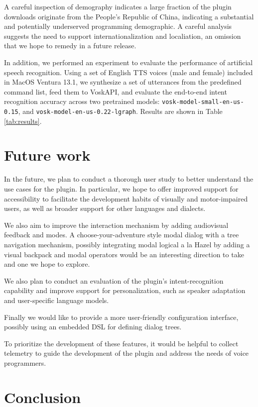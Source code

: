 \documentclass[conference]{IEEEtran}
\begin{document}
A careful inspection of demography indicates a large fraction of the plugin downloads originate from the People's Republic of China, indicating a substantial and potentially underserved programming demographic. A careful analysis suggests the need to support internationalization and localiation, an omission that we hope to remedy in a future release.

In addition, we performed an experiment to evaluate the performance of artificial speech recognition. Using a set of English TTS voices (male and female) included in MacOS Ventura 13.1, we synthesize a set of utterances from the predefined command list, feed them to VoskAPI, and evaluate the end-to-end intent recognition accuracy across two pretrained models: \texttt{vosk-model-small-en-us-0.15}, and \texttt{vosk-model-en-us-0.22-lgraph}. Results are shown in Table \ref{tab:results}.

\section{Future work}

In the future, we plan to conduct a thorough user study to better understand the use cases for the plugin. In particular, we hope to offer improved support for accessibility to facilitate the development habits of visually and motor-impaired users, as well as broader support for other languages and dialects.

We also aim to improve the interaction mechanism by adding audiovisual feedback and modes. A choose-your-adventure style modal dialog with a tree navigation mechanism, possibly integrating modal logical a la Hazel by adding a visual backpack and modal operators would be an interesting direction to take and one we hope to explore.

We also plan to conduct an evaluation of the plugin's intent-recognition capability and improve support for personalization, such as speaker adaptation and user-specific language models.

Finally we would like to provide a more user-friendly configuration interface, possibly using an embedded DSL for defining dialog trees.

To prioritize the development of these features, it would be helpful to collect telemetry to guide the development of the plugin and address the needs of voice programmers.

\section{Conclusion}
\end{document}
